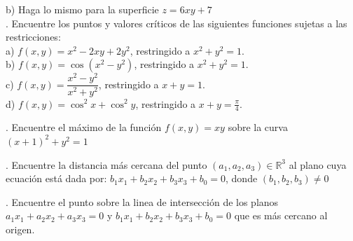 \documentclass[letterpaper]{article}
\renewcommand{\*}{\cdot}
\theoremstyle{definition}
\begin{document}
b) Haga lo mismo para la superficie $z = 6xy + 7$\\

. Encuentre los puntos y valores críticos de las siguientes funciones sujetas a las restricciones:\\


a) $f(x,y) = x^2 - 2xy + 2y^2$, restringido a $x^2 + y^2 =1$.\\

b) $f(x,y) = \cos{(x^2 - y^2)}{}$, restringido a $x^2 + y^2 =1$.\\

c) $f(x,y) = \dfrac{x^2 - y^2}{x^2 + y^2}$, restringido a $x + y =1$.\\

d) $f(x,y) = \cos^2{x} +\cos^2{y}$, restringido a $x + y =\frac{\pi}{4}$.


. Encuentre el máximo de la función $f(x,y) = xy$ sobre la curva $(x +1)^2 + y^2 =1$

. Encuentre la distancia más cercana del punto $(a_1, a_2, a_3) \in \mathbb{R}^3$ al plano cuya ecuación está dada por: $b_1x_1 + b_2x_2 + b_3x_3 + b_0 = 0$, donde $(b_1, b_2, b_3) \neq 0 $

. Encuentre el punto sobre la linea de intersección de los planos  $a_1x_1 + a_2x_2 + a_3x_3 = 0$ y $b_1x_1 + b_2x_2 + b_3x_3 + b_0 = 0$ que es más cercano al origen.
\end{document}
